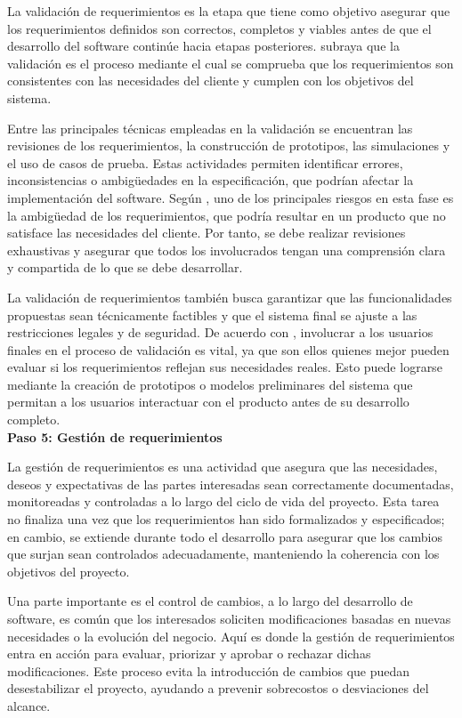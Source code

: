 		La validación de requerimientos es la etapa que tiene como objetivo asegurar que los requerimientos definidos son correctos, completos y viables antes de que el desarrollo del software continúe hacia etapas posteriores. \textcite{sommerville2011introduccion} subraya que la validación es el proceso mediante el cual se comprueba que los requerimientos son consistentes con las necesidades del cliente y cumplen con los objetivos del sistema.
		
		Entre las principales técnicas empleadas en la validación se encuentran las revisiones de los requerimientos, la construcción de prototipos, las simulaciones y el uso de casos de prueba. Estas actividades permiten identificar errores, inconsistencias o ambigüedades en la especificación, que podrían afectar la implementación del software. Según \textcite{pressman2010ingenieria}, uno de los principales riesgos en esta fase es la ambigüedad de los requerimientos, que podría resultar en un producto que no satisface las necesidades del cliente. Por tanto, se debe realizar revisiones exhaustivas y asegurar que todos los involucrados tengan una comprensión clara y compartida de lo que se debe desarrollar.
		
		La validación de requerimientos también busca garantizar que las funcionalidades propuestas sean técnicamente factibles y que el sistema final se ajuste a las restricciones legales y de seguridad. De acuerdo con \textcite{sommerville2011introduccion}, involucrar a los usuarios finales en el proceso de validación es vital, ya que son ellos quienes mejor pueden evaluar si los requerimientos reflejan sus necesidades reales. Esto puede lograrse mediante la creación de prototipos o modelos preliminares del sistema que permitan a los usuarios interactuar con el producto antes de su desarrollo completo.\\
		\textbf{Paso 5: Gestión de requerimientos}
		
		La gestión de requerimientos es una actividad que asegura que las necesidades, deseos y expectativas de las partes interesadas sean correctamente documentadas, monitoreadas y controladas a lo largo del ciclo de vida del proyecto. Esta tarea no finaliza una vez que los requerimientos han sido formalizados y especificados; en cambio, se extiende durante todo el desarrollo para asegurar que los cambios que surjan sean controlados adecuadamente, manteniendo la coherencia con los objetivos del proyecto.
		
		Una parte importante es el control de cambios, a lo largo del desarrollo de software, es común que los interesados soliciten modificaciones basadas en nuevas necesidades o la evolución del negocio. Aquí es donde la gestión de requerimientos entra en acción para evaluar, priorizar y aprobar o rechazar dichas modificaciones. Este proceso evita la introducción de cambios que puedan desestabilizar el proyecto, ayudando a prevenir sobrecostos o desviaciones del alcance.
		
